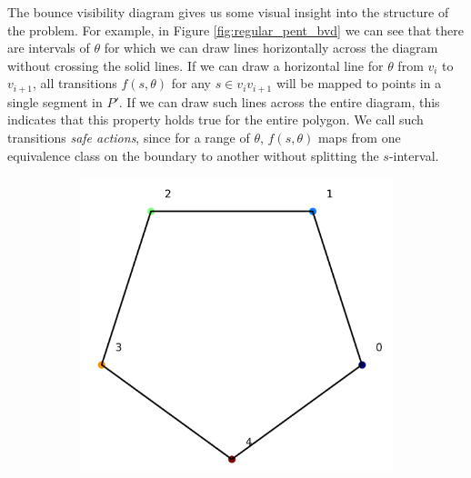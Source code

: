 \documentclass[]{styles/svproc}  %
\begin{document}
The bounce visibility diagram gives us some visual insight into the structure of
the problem. For example, in Figure \ref{fig:regular_pent_bvd} we can see that
there are intervals of $\theta$ for which we can draw lines horizontally across
the diagram without crossing the solid lines. If we can draw a horizontal line
for $\theta$ from $v_i$ to $v_{i+1}$, all transitions $f(s,\theta)$
for any $s \in v_i v_{i+1}$ will be mapped to points in a single segment in
$P'$. If we can
draw such lines across the entire diagram, this indicates that this property
holds true for the entire polygon. We call such transitions \emph{safe
actions}, since for a range of $\theta$, $f(s,\theta)$ maps from one equivalence
class on the boundary to another without splitting the $s$-interval.

\begin{figure}
\centering
\begin{subfigure}{0.35\textwidth}
\centering
\includegraphics[width=\linewidth]{figures/regular_pent.png}
\end{subfigure}%
\begin{subfigure}{0.35\textwidth}
\centering

\end{subfigure}
\end{figure}
\end{document}
